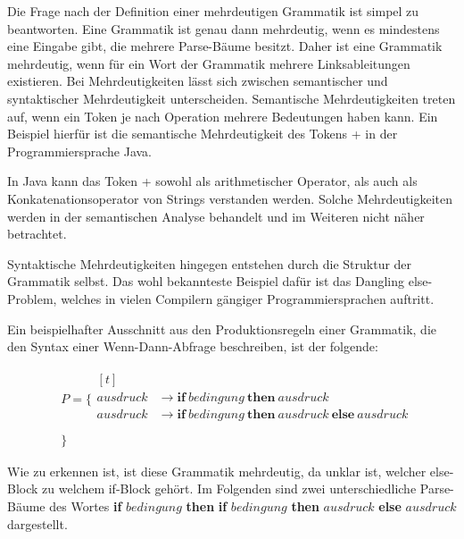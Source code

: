 \documentclass[runningheads]{llncs}
\begin{document}
    Die Frage nach der Definition einer mehrdeutigen Grammatik ist simpel zu beantworten.
    Eine Grammatik ist genau dann mehrdeutig, wenn es mindestens eine Eingabe gibt, die mehrere Parse-Bäume besitzt.
    Daher ist eine Grammatik mehrdeutig, wenn für ein Wort der Grammatik mehrere Linksableitungen existieren\cite{watrous2020parse}.
    Bei Mehrdeutigkeiten lässt sich zwischen semantischer und syntaktischer Mehrdeutigkeit unterscheiden.
    Semantische Mehrdeutigkeiten treten auf, wenn ein Token je nach Operation mehrere Bedeutungen haben kann.
    Ein Beispiel hierfür ist die semantische Mehrdeutigkeit des Tokens \glqq +\grqq{} in der Programmiersprache Java.

    In Java kann das Token \glqq +\grqq{} sowohl als arithmetischer Operator,
    als auch als Konkatenationsoperator von Strings verstanden werden.
    Solche Mehrdeutigkeiten werden in der semantischen Analyse behandelt und im Weiteren nicht näher betrachtet.

    Syntaktische Mehrdeutigkeiten hingegen entstehen durch die Struktur der Grammatik selbst.
    Das wohl bekannteste Beispiel dafür ist das \glqq Dangling else\grqq{}-Problem,
    welches in vielen Compilern gängiger Programmiersprachen auftritt\cite{abrahams1966association}.

    Ein beispielhafter Ausschnitt aus den Produktionsregeln einer Grammatik, die den Syntax einer Wenn-Dann-Abfrage beschreiben,
    ist der folgende:


    \begin{align*}
        & P = \{ \begin{aligned}[t]
                     \\
                     ausdruck & \rightarrow \textbf{if} \ bedingung \ \textbf{then} \ ausdruck \\
                     ausdruck & \rightarrow \textbf{if} \ bedingung \ \textbf{then} \ ausdruck \ \textbf{else} \ ausdruck \\
        \end{aligned} \\
        & \}
    \end{align*}

    Wie zu erkennen ist, ist diese Grammatik mehrdeutig, da unklar ist,
    welcher \glqq else\grqq{}-Block zu welchem \glqq if\grqq{}-Block gehört.
    Im Folgenden sind zwei unterschiedliche Parse-Bäume des Wortes
    \glqq \textbf{if} $bedingung$ \textbf{then} \textbf{if} $bedingung$ \textbf{then} $ausdruck$ \textbf{else} $ausdruck$\grqq{}
    dargestellt.
\end{document}
